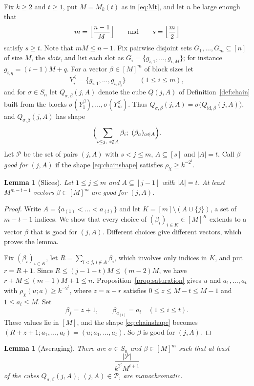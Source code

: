 \documentclass[11pt,reqno]{amsart}
\numberwithin{equation}{section}
\theoremstyle{plain}
\newtheorem{lemma}[theorem]{Lemma}
\theoremstyle{definition}
\theoremstyle{remark}
\newcommand{\cP}{\mathcal{P}}
\begin{document}
Fix $k\ge2$ and $t\ge1$, put $M=M_k(t)$ as in \eqref{eq:Mt}, and let $n$
be large enough that
\[
m=\Bigl\lfloor\frac{n-1}{M}\Bigr\rfloor\qquad\text{and}\qquad
s=\Bigl\lfloor\frac m2\Bigr\rfloor
\]
satisfy $s\ge t$. Note that $mM\le n-1$. Fix pairwise disjoint sets
$G_1,\dots,G_m\subseteq[n]$ of size $M$, the \emph{slots}, and list each
slot as $G_i=\{g_{i,1},\dots,g_{i,M}\}$; for instance
$g_{i,q}=(i-1)M+q$. For a vector $\beta\in[M]^{m}$ of block sizes let
\[
Y_i^{\beta}=\{g_{i,1},\dots,g_{i,\beta_i}\}\qquad(1\le i\le m),
\]
and for $\sigma\in S_n$ let $Q_{\sigma,\beta}(j,A)$ denote the cube
$Q(j,A)$ of Definition~\ref{def:chain} built from the blocks
$\sigma(Y_1^{\beta}),\dots,\sigma(Y_m^{\beta})$. Thus
$Q_{\sigma,\beta}(j,A)=\sigma\bigl(Q_{\mathrm{id},\beta}(j,A)\bigr)$, and
$Q_{\sigma,\beta}(j,A)$ has shape
\begin{equation}
\label{eq:chainshape}
\Bigl(\sum_{i\le j,\ i\notin A}\beta_i;\ (\beta_a)_{a\in A}\Bigr).
\end{equation}
Let $\cP$ be the set of pairs $(j,A)$ with $s<j\le m$, $A\subseteq[s]$
and $|A|=t$. Call $\beta$ \emph{good for} $(j,A)$ if the shape
\eqref{eq:chainshape} satisfies $\rho_\chi\ge k^{-2^{t}}$.

\begin{lemma}[Slices]
\label{lem:slices}
Let $1\le j\le m$ and $A\subseteq[j-1]$ with $|A|=t$. At least
$M^{m-t-1}$ vectors $\beta\in[M]^{m}$ are good for $(j,A)$.
\end{lemma}

\begin{proof}
Write $A=\{a_{(1)}<\dots<a_{(t)}\}$ and let $K=[m]\setminus(A\cup\{j\})$,
a set of $m-t-1$ indices. We show that every choice of $(\beta_i)_{i\in
K}\in[M]^{K}$ extends to a vector $\beta$ that is good for $(j,A)$.
Different choices give different vectors, which proves the lemma.

Fix $(\beta_i)_{i\in K}$, let $R=\sum_{i<j,\,i\notin A}\beta_i$, which
involves only indices in $K$, and put $r=R+1$. Since $R\le(j-1-t)M\le
(m-2)M$, we have $r+M\le(m-1)M+1\le n$. Proposition~\ref{prop:saturation}
gives $u$ and $a_1,\dots,a_t$ with $\rho_\chi(u;a)\ge k^{-2^{t}}$, where
$z=u-r$ satisfies $0\le z\le M-t\le M-1$ and $1\le a_i\le M$. Set
\[
\beta_j=z+1,\qquad \beta_{a_{(i)}}=a_i\quad(1\le i\le t).
\]
These values lie in $[M]$, and the shape \eqref{eq:chainshape} becomes
$(R+z+1;a_1,\dots,a_t)=(u;a_1,\dots,a_t)$. So $\beta$ is good for
$(j,A)$.
\end{proof}

\begin{lemma}[Averaging]
\label{lem:average}
There are $\sigma\in S_n$ and $\beta\in[M]^{m}$ such that at least
\[
\frac{|\cP|}{k^{2^{t}}M^{t+1}}
\]
of the cubes $Q_{\sigma,\beta}(j,A)$, $(j,A)\in\cP$, are monochromatic.
\end{lemma}
\end{document}
